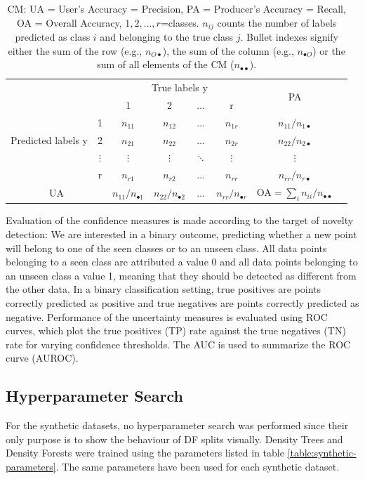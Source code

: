 \documentclass[10pt]{article}
\begin{document}
\begin{table}[H]
	\centering
	\begin{tabular}{cc|c|c|c|c|cl}
		& & \multicolumn{4}{c|}{True labels y}&\multirow{2}{*}{PA}\\
		\multirow{5}{*}{Predicted labels y} &  & 1& 2& $\hdots$ &r  &\\ \cline{1-7} 
		& 1 &  $n_{11}$ & $n_{12}$ & $\hdots$ & $n_{1r}$& $n_{11}/n_{1\bullet}$ \\ \cline{2-7} 
		& 2 & $n_{21}$ & $n_{22}$ &$\hdots$  &$n_{2r}$ &$n_{22}/n_{2\bullet}$\\ \cline{2-7} 
		& $\vdots$ & $\vdots$ & $\vdots$ &$\ddots$  &$\vdots$&$\vdots$\\ \cline{2-7} 
		& r & $n_{r1}$ & $n_{r2}$ &$\hdots$  & $n_{rr}$ & $n_{rr}/n_{r\bullet}$ \\\cline{1-7} 
		\multicolumn{2}{c|}{UA} & $n_{11}/n_{\bullet 1}$ & $n_{22}/n_{\bullet 2}$ & $\hdots$ & $n_{rr}/n_{\bullet r}$ & OA$=\sum_in_{ii}/n_{\bullet\bullet}$\\
	\end{tabular}
	\caption{\acrlong{CM}: UA = User's Accuracy = Precision, PA = Producer's Accuracy = Recall, OA = Overall Accuracy, $1,2,\hdots,r$=classes. $n_{ij}$ counts the number of labels predicted as class $i$ and belonging to the true class $j$. Bullet indexes signify either the sum of the row (e.g., $n_{O\bullet}$), the sum of the column (e.g., $n_{\bullet O}$) or the sum of all elements of the \acrlong{CM} ($n_{\bullet\bullet}$).}
	\label{table:cm}
\end{table}

Evaluation of the confidence measures is made according to the target of novelty detection: We are interested in a binary outcome, predicting whether a new point will belong to one of the seen classes or to an unseen class. All data points belonging to a seen class are attributed a value 0 and all data points belonging to an unseen class a value 1, meaning that they should be detected as different from the other data. In a binary classification setting, true positives are points correctly predicted as positive and true negatives are points correctly predicted as negative. Performance of the uncertainty measures is evaluated using \gls{ROC} curves, which plot the true positives (TP) rate against the true negatives (TN) rate for varying confidence thresholds.  The \gls{AUC} is used to summarize the \gls{ROC} curve (\gls{AUROC}).


\subsection{Hyperparameter Search}
For the synthetic datasets, no hyperparameter search was performed since their only purpose is to show the behaviour of \acrlong{DF} splits visually. Density Trees and Density Forests were trained using the parameters listed in table \ref{table:synthetic-parameters}. The same parameters have been used for each synthetic dataset.
\end{document}

